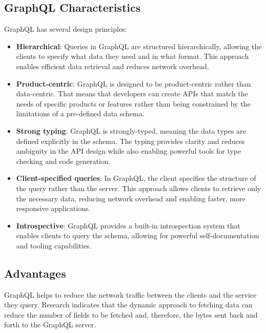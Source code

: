 \subsection{GraphQL Characteristics}\label{subsection:background:graphql:graphql-characteristics}

GraphQL has several design principles: \cite{misc:-:background:graphql:graphql-specification}

\begin{itemize}
  \item \textbf{Hierarchical}: Queries in GraphQL are structured hierarchically, allowing the clients to specify what data they need and in what format. This approach enables efficient data retrieval and reduces network overhead.

  \item \textbf{Product-centric}: GraphQL is designed to be product-centric rather than data-centric. That means that developers can create \acp{API} that match the needs of specific products or features rather than being constrained by the limitations of a pre-defined data schema.

  \item \textbf{Strong typing}: GraphQL is strongly-typed, meaning the data types are defined explicitly in the schema. The typing provides clarity and reduces ambiguity in the \ac{API} design while also enabling powerful tools for type checking and code generation.

  \item \textbf{Client-specified queries}: In GraphQL, the client specifies the structure of the query rather than the server. This approach allows clients to retrieve only the necessary data, reducing network overhead and enabling faster, more responsive applications.

  \item \textbf{Introspective}: GraphQL provides a built-in introspection system that enables clients to query the schema, allowing for powerful self-documentation and tooling capabilities.
\end{itemize}

\subsection{Advantages}\label{subsection:background:graphql:graphql-advantages}

GraphQL helps to reduce the network traffic between the clients and the service they query. Research indicates that the dynamic approach to fetching data can reduce the number of fields to be fetched and, therefore, the bytes sent back and forth to the GraphQL server. \cite{inprocessdings:2019:background:graphql:migration-to-graphql}

